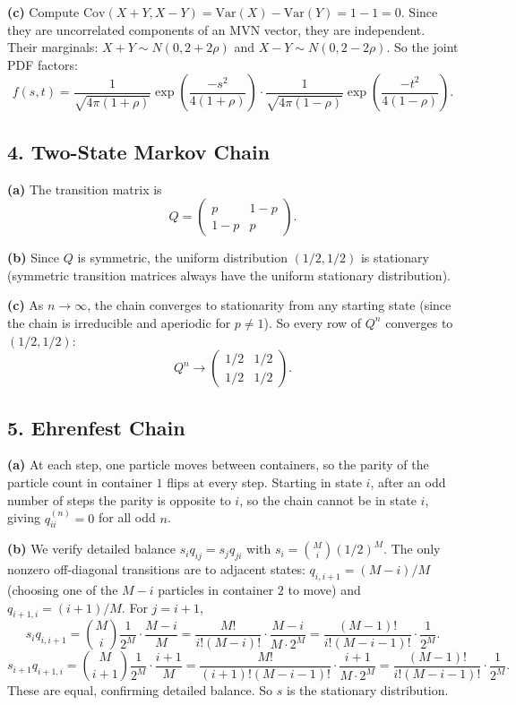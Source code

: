 \documentclass{article}
\begin{document}
\textbf{(c)} Compute $\text{Cov}(X+Y,X-Y)=\text{Var}(X)-\text{Var}(Y)=1-1=0$. Since they are uncorrelated components of an MVN vector, they are independent. Their marginals: $X+Y\sim N(0,2+2\rho)$ and $X-Y\sim N(0,2-2\rho)$. So the joint PDF factors:
$$
f(s,t)=\frac{1}{\sqrt{4\pi(1+\rho)}}\exp\!\left(\frac{-s^2}{4(1+\rho)}\right)\cdot\frac{1}{\sqrt{4\pi(1-\rho)}}\exp\!\left(\frac{-t^2}{4(1-\rho)}\right).
$$

\subsection*{4. Two-State Markov Chain}

\textbf{(a)} The transition matrix is
$$
Q=\begin{pmatrix}p & 1-p\\ 1-p & p\end{pmatrix}.
$$

\textbf{(b)} Since $Q$ is symmetric, the uniform distribution $(1/2,1/2)$ is stationary (symmetric transition matrices always have the uniform stationary distribution).

\textbf{(c)} As $n\to\infty$, the chain converges to stationarity from any starting state (since the chain is irreducible and aperiodic for $p\ne1$). So every row of $Q^n$ converges to $(1/2,1/2)$:
$$
Q^n\to\begin{pmatrix}1/2 & 1/2\\ 1/2 & 1/2\end{pmatrix}.
$$

\subsection*{5. Ehrenfest Chain}

\textbf{(a)} At each step, one particle moves between containers, so the parity of the particle count in container $1$ flips at every step. Starting in state $i$, after an odd number of steps the parity is opposite to $i$, so the chain cannot be in state $i$, giving $q_{ii}^{(n)}=0$ for all odd $n$.

\textbf{(b)} We verify detailed balance $s_i q_{ij}=s_j q_{ji}$ with $s_i=\binom{M}{i}(1/2)^M$. The only nonzero off-diagonal transitions are to adjacent states: $q_{i,i+1}=(M-i)/M$ (choosing one of the $M-i$ particles in container $2$ to move) and $q_{i+1,i}=(i+1)/M$. For $j=i+1$,
$$
s_i q_{i,i+1}=\binom{M}{i}\frac{1}{2^M}\cdot\frac{M-i}{M}=\frac{M!}{i!(M-i)!}\cdot\frac{M-i}{M\cdot2^M}=\frac{(M-1)!}{i!(M-i-1)!}\cdot\frac{1}{2^M}.
$$
$$
s_{i+1}q_{i+1,i}=\binom{M}{i+1}\frac{1}{2^M}\cdot\frac{i+1}{M}=\frac{M!}{(i+1)!(M-i-1)!}\cdot\frac{i+1}{M\cdot2^M}=\frac{(M-1)!}{i!(M-i-1)!}\cdot\frac{1}{2^M}.
$$
These are equal, confirming detailed balance. So $s$ is the stationary distribution.
\end{document}
